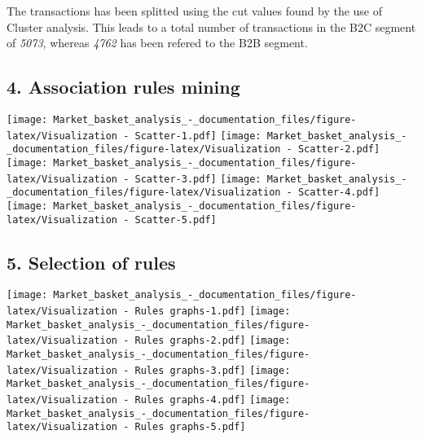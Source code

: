 \documentclass[]{article}
\begin{document}
The transactions has been splitted using the cut values found by the use
of Cluster analysis. This leads to a total number of transactions in the
B2C segment of \emph{5073}, whereas \emph{4762} has been refered to the
B2B segment.

\hypertarget{association-rules-mining}{%
\subsection{4. Association rules
mining}\label{association-rules-mining}}

\texttt{[image: Market\_basket\_analysis\_-\_documentation\_files/figure-latex/Visualization - Scatter-1.pdf]}
\texttt{[image: Market\_basket\_analysis\_-\_documentation\_files/figure-latex/Visualization - Scatter-2.pdf]}
\texttt{[image: Market\_basket\_analysis\_-\_documentation\_files/figure-latex/Visualization - Scatter-3.pdf]}
\texttt{[image: Market\_basket\_analysis\_-\_documentation\_files/figure-latex/Visualization - Scatter-4.pdf]}
\texttt{[image: Market\_basket\_analysis\_-\_documentation\_files/figure-latex/Visualization - Scatter-5.pdf]}

\hypertarget{selection-of-rules}{%
\subsection{5. Selection of rules}\label{selection-of-rules}}

\texttt{[image: Market\_basket\_analysis\_-\_documentation\_files/figure-latex/Visualization - Rules graphs-1.pdf]}
\texttt{[image: Market\_basket\_analysis\_-\_documentation\_files/figure-latex/Visualization - Rules graphs-2.pdf]}
\texttt{[image: Market\_basket\_analysis\_-\_documentation\_files/figure-latex/Visualization - Rules graphs-3.pdf]}
\texttt{[image: Market\_basket\_analysis\_-\_documentation\_files/figure-latex/Visualization - Rules graphs-4.pdf]}
\texttt{[image: Market\_basket\_analysis\_-\_documentation\_files/figure-latex/Visualization - Rules graphs-5.pdf]}
\end{document}
